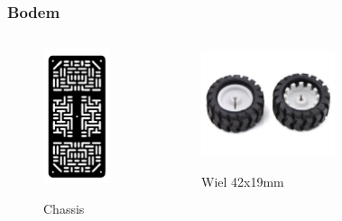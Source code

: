 \documentclass
   [kulak] %
   {kulakbeamer}
\begin{document}
\begin{frame}
	\frametitle{Bodem} %
	
	\begin{columns}
		\begin{figure}
			\centering
			\includegraphics[width=.45\textwidth]{chassis}
			\caption{\scriptsize Chassis}\cite{RobotChassisRechthoekigZwart}
		\end{figure}
		\begin{figure}
			\centering
			\includegraphics[width=.7\textwidth]{wielen}
			\caption{\scriptsize Wiel 42x19mm}\cite{Wiel42x19mm}
		\end{figure}
		\begin{figure}

\end{figure}
\end{columns}
\end{frame}
\end{document}
